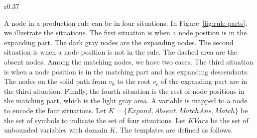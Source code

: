 \begin{wrapfigure}{r}{0.37\textwidth}
    \vspace{-3mm}
        \center
  \caption{Parts of production rules in the rule templates.}
  \label{fig:rule-parts}
  \vspace{-8mm}
\end{wrapfigure}
A node in a production rule can be in four situations.
In Figure~\ref{fig:rule-parts}, we illustrate the situations.
The first situation is when a node position is in the expanding part.
The dark gray nodes are the expanding nodes.
The second situation is when a node position is not in the rule.
The dashed area are the absent nodes.
Among the matching nodes, we have two cases.
The third situation is when a node position is in the matching part
and has expanding descendants.
The nodes on the solid path from $v_0$ to the root $v_e$ of the expanding part are in the third situation.
Finally, the fourth situation is the rest of node positions
in the matching part, which is the light gray area.
A variable is mapped to a node to encode the four situations.
Let $K =\{Expand,Absent,MatchAns,Match\}$ be the set of symbols to
indicate the set of four situations.
Let $KVars$ be the set of unbounded variables with domain $K$. 
The templates are defined as follows.




